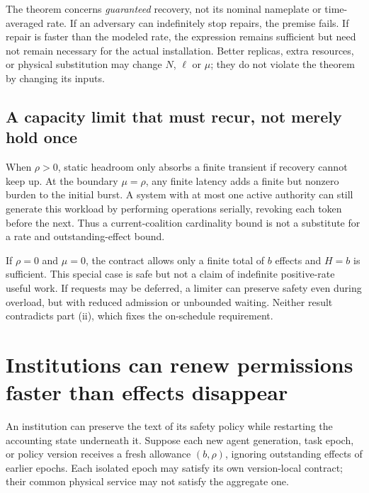 The theorem concerns \emph{guaranteed} recovery, not its nominal nameplate or time-averaged rate. If an adversary can indefinitely stop repairs, the premise fails. If repair is faster than the modeled rate, the expression remains sufficient but need not remain necessary for the actual installation. Better replicas, extra resources, or physical substitution may change $N$, $\ell$ or $\mu$; they do not violate the theorem by changing its inputs.

\subsection{A capacity limit that must recur, not merely hold once}
When $\rho>0$, static headroom only absorbs a finite transient if recovery cannot keep up. At the boundary $\mu=\rho$, any finite latency adds a finite but nonzero burden to the initial burst. A system with at most one active authority can still generate this workload by performing operations serially, revoking each token before the next. Thus a current-coalition cardinality bound is not a substitute for a rate and outstanding-effect bound.

If $\rho=0$ and $\mu=0$, the contract allows only a finite total of $b$ effects and $H=b$ is sufficient. This special case is safe but not a claim of indefinite positive-rate useful work. If requests may be deferred, a limiter can preserve safety even during overload, but with reduced admission or unbounded waiting. Neither result contradicts part (ii), which fixes the on-schedule requirement.

\section{Institutions can renew permissions faster than effects disappear}
\label{sec:epochs}
An institution can preserve the text of its safety policy while restarting the accounting state underneath it. Suppose each new agent generation, task epoch, or policy version receives a fresh allowance $(b,\rho)$, ignoring outstanding effects of earlier epochs. Each isolated epoch may satisfy its own version-local contract; their common physical service may not satisfy the aggregate one.

